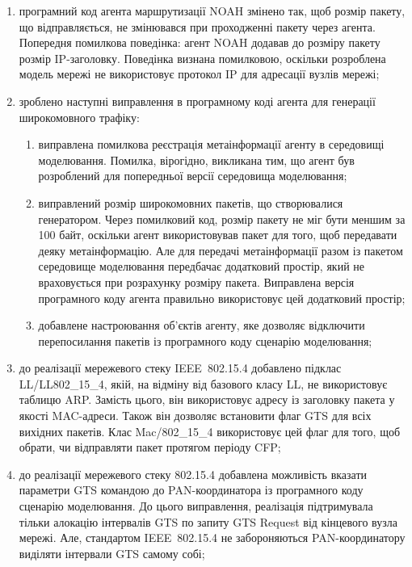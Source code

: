 \documentclass[a4paper,ukrainian,utf8,nocolumnsxix,nocolumnxxxii,nocolumnxxxi,floatsection,equationsection]{eskdtext}
\newcommand{\iee}[0]{IEEE~802.15.4\xspace}
\begin{document}
\begin{enumerate}

	\item програмний код агента маршрутизації NOAH змінено так, щоб розмір пакету, що відправляється, не змінювався при проходженні пакету через агента. Попередня помилкова поведінка: агент NOAH додавав до розміру пакету розмір IP-заголовку. Поведінка визнана помилковою, оскільки розроблена модель мережі не використовує протокол IP для адресації вузлів мережі; 

	\item зроблено наступні виправлення в програмному коді агента для генерації широкомовного трафіку:
	\begin{enumerate}
		\item виправлена помилкова реєстрація метаінформації агенту в середовищі моделювання. Помилка, вірогідно, викликана тим, що агент був розроблений для попередньої версії середовища моделювання;
		
		\item виправлений розмір широкомовних пакетів, що створювалися генератором. Через помилковий код, розмір пакету не міг бути меншим за 100 байт, оскільки агент використовував пакет для того, щоб передавати деяку метаінформацію. Але для передачі метаінформації разом із пакетом середовище моделювання передбачає додатковий простір, який не враховується при розрахунку розміру пакета. Виправлена версія програмного коду агента правильно використовує цей додатковий простір;
		
		\item добавлене настроювання об'єктів агенту, яке дозволяє відключити перепосилання пакетів із програмного коду сценарію моделювання;
	\end{enumerate}

	\item до реалізації мережевого стеку \iee добавлено підклас LL/LL802\_15\_4, якій, на відміну від базового класу LL, не використовує таблицю ARP. Замість цього, він використовує адресу із заголовку пакета у якості MAC-адреси. Також він дозволяє встановити флаг GTS для всіх вихідних пакетів. Клас Mac/802\_15\_4 використовує цей флаг для того, щоб обрати, чи відправляти пакет протягом періоду CFP; 

	\item до реалізації мережевого стеку 802.15.4 добавлена можливість вказати параметри GTS командою до PAN-координатора із програмного коду сценарію моделювання. До цього виправлення, реалізація підтримувала тільки алокацію інтервалів GTS по запиту GTS Request від кінцевого вузла мережі. Але, стандартом \iee не забороняються PAN-координатору виділяти інтервали GTS самому собі;



\end{enumerate}
\end{document}
